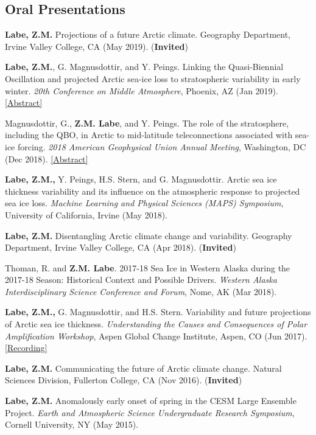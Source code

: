 \documentclass[margin,line,palatino,courier,10pt]{res}
\begin{document}
\begin{resume}
\section{\sc \textcolor{Cerulean}{\large{\textbf{Oral Presentations}}}}
\begin{etaremune}[leftmargin=0in,topsep=0in,parsep=0in]
\item \textbf{Labe, Z.M.} Projections of a future Arctic climate. Geography Department, Irvine Valley College, CA (May 2019). (\textbf{Invited})
\item \textbf{Labe, Z.M.}, G. Magnusdottir, and Y. Peings. Linking the Quasi-Biennial Oscillation and projected Arctic sea-ice loss to stratospheric variability in early winter. \textit{20th Conference on Middle Atmosphere}, Phoenix, AZ (Jan 2019). \href{https://ams.confex.com/ams/2019Annual/meetingapp.cgi/Paper/352664}{[Abstract]}
\item Magnusdottir, G., \textbf{Z.M. Labe}, and Y. Peings. The role of the stratosphere, including the QBO, in Arctic to mid-latitude teleconnections associated with sea-ice forcing. \textit{2018 American Geophysical Union Annual Meeting}, Washington, DC (Dec 2018). \href{https://agu.confex.com/agu/fm18/meetingapp.cgi/Paper/399117"}{[Abstract]}
\item \textbf{Labe, Z.M.,} Y. Peings, H.S. Stern, and G. Magnusdottir. Arctic sea ice thickness variability and its influence on the atmospheric response to projected sea ice loss. \textit{Machine Learning and Physical Sciences (MAPS) Symposium}, University of California, Irvine (May 2018). 
\item \textbf{Labe, Z.M.} Disentangling Arctic climate change and variability. Geography Department, Irvine Valley College, CA (Apr 2018). (\textbf{Invited})
\item Thoman, R. and \textbf{Z.M. Labe}. 2017-18 Sea Ice in Western Alaska during the 2017-18 Season: Historical Context and Possible Drivers. \textit{Western Alaska Interdisciplinary Science Conference and Forum}, Nome, AK (Mar 2018). 
\item \textbf{Labe, Z.M.,} G. Magnusdottir, and H.S. Stern. Variability and future projections of Arctic sea ice thickness. \textit{Understanding the Causes and Consequences of Polar Amplification Workshop}, Aspen Global Change Institute, Aspen, CO (Jun 2017). \href{https://www.agci.org/lib/17s1/variability-and-future-projections-arctic-sea-ice-thickness}{[Recording]}
\item \textbf{Labe, Z.M.} Communicating the future of Arctic climate change. Natural Sciences Division, Fullerton College, CA (Nov 2016). (\textbf{Invited})
\item \textbf{Labe, Z.M.} Anomalously early onset of spring in the CESM Large Ensemble Project. \textit{Earth and Atmospheric Science Undergraduate Research Symposium}, Cornell University, NY (May 2015). 


\end{etaremune}
\end{resume}
\end{document}

